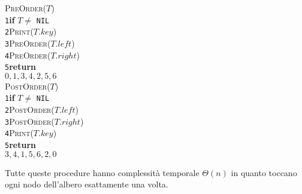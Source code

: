 \documentclass[10pt,landscape]{article}
\begin{document}
\begin{multicols*}{4}
\begin{multicols}{3}
                        \columnbreak
                        \textsc{PreOrder($T$)}\\ [3pt]
                        \verb|1|\hspace*{0.5em}\textbf{if} $T \neq$ \verb|NIL|\\
                        \verb|2|\hspace*{1.2em}\textsc{Print($T.key$)}\\
                        \verb|3|\hspace*{1.2em}\textsc{PreOrder($T.left$)}\\
                        \verb|4|\hspace*{1.2em}\textsc{PreOrder($T.right$)}\\
                        \verb|5|\hspace*{0.5em}\textbf{return}\\  [5pt]
                        $0,1,3,4,2,5,6$\\
                        \columnbreak
                        \textsc{PostOrder($T$)}\\ [3pt]
                        \verb|1|\hspace*{0.5em}\textbf{if} $T \neq$ \verb|NIL|\\
                        \verb|2|\hspace*{1.2em}\textsc{PostOrder($T.left$)}\\
                        \verb|3|\hspace*{1.2em}\textsc{PostOrder($T.right$)}\\
                        \verb|4|\hspace*{1.2em}\textsc{Print($T.key$)}\\
                        \verb|5|\hspace*{0.5em}\textbf{return}\\  [5pt]
                        $3,4,1,5,6,2,0$\\
                \end{multicols}
                Tutte queste procedure hanno complessità temporale $\Theta(n)$ in quanto toccano ogni nodo dell'albero esattamente una volta.

\end{multicols*}
\end{document}
